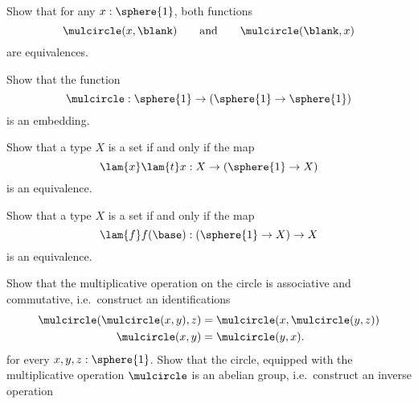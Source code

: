 \begin{exercises}
\begin{subexenum}
  \end{subexenum}
  \exitem \label{ex:mulcircle-is-equiv}
  \begin{subexenum}
  \item Show that for any $x:\sphere{1}$, both functions
    \begin{equation*}
      \mulcircle(x,\blank)\qquad\text{and}\qquad\mulcircle(\blank,x)
    \end{equation*}
    are equivalences.
  \item Show that the function
    \begin{equation*}
      \mulcircle : \sphere{1}\to(\sphere{1}\to\sphere{1})
    \end{equation*}
    is an embedding.
  \end{subexenum}
  \exitem \label{ex:circle_connected}
  \begin{subexenum}
  \item Show that a type $X$ is a set if and only if the map
    \begin{equation*}
      \lam{x}\lam{t} x : X \to (\sphere{1}\to X)
    \end{equation*}
    is an equivalence.
  \item Show that a type $X$ is a set if and only if the map
    \begin{equation*}
      \lam{f}f(\base) : (\sphere{1}\to X)\to X
    \end{equation*}
    is an equivalence.
  \end{subexenum}
  \exitem Show that the multiplicative operation on the circle is associative and commutative, i.e.~construct an identifications
  \begin{align*}
    \mulcircle(\mulcircle(x,y),z) & = \mulcircle(x,\mulcircle(y,z)) \\
    \mulcircle(x,y) & =\mulcircle(y,x).
  \end{align*}
  for every $x,y,z:\sphere{1}$.
  \exitem Show that the circle, equipped with the multiplicative operation $\mulcircle$ is an abelian group, i.e.~construct an inverse operation
  \begin{equation*}

\end{equation*}
\end{exercises}
